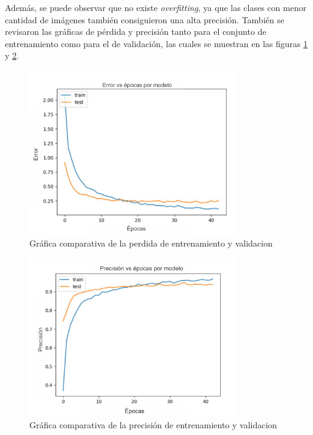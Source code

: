  Además, se puede observar que no existe \textit{overfitting}, ya que las clases con menor cantidad de imágenes también consiguieron una alta precisión. También se revisaron las gráficas de pérdida y precisión tanto para el conjunto de entrenamiento como para el de validación, las cuales se muestran en las figuras \ref{fig:losses4} y \ref{fig:accuracy4}.
\\
\begin{figure}[h!]
\centering
\includegraphics[width=0.8\textwidth]{images/loss4.png}
\caption{Gráfica comparativa de la perdida de entrenamiento y validacion}
\label{fig:losses4}
\end{figure}

\begin{figure}[h!]
\centering
\includegraphics[width=0.8\textwidth]{images/accuracy4.png}
\caption{Gráfica comparativa de la precisión de entrenamiento y validacion}
\label{fig:accuracy4}
\end{figure}


